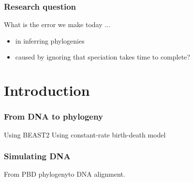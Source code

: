 \documentclass{beamer}
\begin{document}
\begin{frame}
  \frametitle{Research question}

  What is the error we make today ...

  \begin{itemize}
    \item in inferring phylogenies
    \item caused by ignoring that speciation takes time to complete?
  \end{itemize}

\end{frame}

\section[Introduction]{Introduction}

\begin{frame}
  \frametitle{From DNA to phylogeny}

  Using BEAST2\footnotemark
  Using constant-rate birth-death model\footnotemark



\end{frame}

\begin{frame}
  \frametitle{Simulating DNA}

  From PBD phylogeny\footnotemark to DNA alignment\footnotemark.


\end{frame}
\end{document}
